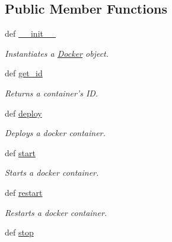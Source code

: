 \subsection*{Public Member Functions}
\begin{DoxyCompactItemize}
\item 
def \hyperlink{classhypervisor_1_1docker__driver_1_1Docker_a95faee6439e35695f424c61763b4077e}{\-\_\-\-\_\-init\-\_\-\-\_\-}
\begin{DoxyCompactList}\small\item\em Instantiates a \hyperlink{classhypervisor_1_1docker__driver_1_1Docker}{Docker} object. \end{DoxyCompactList}\item 
def \hyperlink{classhypervisor_1_1docker__driver_1_1Docker_aa6d1c57b5e6eb40c234af79445d5ccaa}{get\-\_\-id}
\begin{DoxyCompactList}\small\item\em Returns a container's I\-D. \end{DoxyCompactList}\item 
def \hyperlink{classhypervisor_1_1docker__driver_1_1Docker_ab7550e8839169bb0c1ba08050709f1a7}{deploy}
\begin{DoxyCompactList}\small\item\em Deploys a docker container. \end{DoxyCompactList}\item 
\hypertarget{classhypervisor_1_1docker__driver_1_1Docker_ae22fe7316ede6ff4986ec8c911602e61}{def \hyperlink{classhypervisor_1_1docker__driver_1_1Docker_ae22fe7316ede6ff4986ec8c911602e61}{start}}\label{classhypervisor_1_1docker__driver_1_1Docker_ae22fe7316ede6ff4986ec8c911602e61}

\begin{DoxyCompactList}\small\item\em Starts a docker container. \end{DoxyCompactList}\item 
\hypertarget{classhypervisor_1_1docker__driver_1_1Docker_a9455c971d4a2824d7ef8b0786b2d754b}{def \hyperlink{classhypervisor_1_1docker__driver_1_1Docker_a9455c971d4a2824d7ef8b0786b2d754b}{restart}}\label{classhypervisor_1_1docker__driver_1_1Docker_a9455c971d4a2824d7ef8b0786b2d754b}

\begin{DoxyCompactList}\small\item\em Restarts a docker container. \end{DoxyCompactList}\item 
\hypertarget{classhypervisor_1_1docker__driver_1_1Docker_a24338352bbdd29ceda701bae00f256c4}{def \hyperlink{classhypervisor_1_1docker__driver_1_1Docker_a24338352bbdd29ceda701bae00f256c4}{stop}}\label{classhypervisor_1_1docker__driver_1_1Docker_a24338352bbdd29ceda701bae00f256c4}


\end{DoxyCompactItemize}
